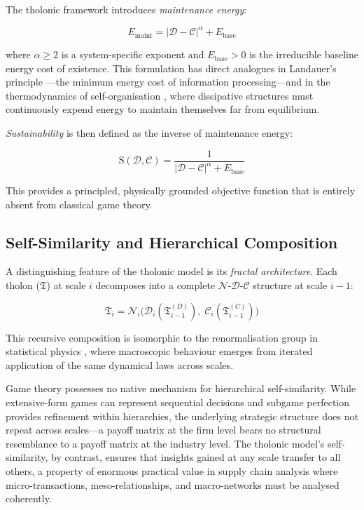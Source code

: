 \documentclass[12pt,a4paper,twocolumn]{article}
\newcommand{\N}{\mathcal{N}}
\newcommand{\D}{\mathcal{D}}
\newcommand{\CC}{\mathcal{C}}
\newcommand{\Sust}{\mathrm{S}}
\newcommand{\Ebase}{E_{\mathrm{base}}}
\newcommand{\tholon}{\mathfrak{T}}
\begin{document}
The tholonic framework introduces \emph{maintenance energy}:

\begin{equation}
\label{eq:maintenance}
E_{\mathrm{maint}} = |\D - \CC|^\alpha + \Ebase
\end{equation}

where $\alpha \geq 2$ is a system-specific exponent and $\Ebase > 0$ is the irreducible baseline energy cost of existence.
This formulation has direct analogues in Landauer's principle \citep{Landauer1961}---the minimum energy cost of information processing---and in the thermodynamics of self-organisation \citep{England2013}, where dissipative structures must continuously expend energy to maintain themselves far from equilibrium.

\emph{Sustainability} is then defined as the inverse of maintenance energy:

\begin{equation}
\label{eq:sustainability}
\Sust(\D, \CC) = \frac{1}{|\D - \CC|^\alpha + \Ebase}
\end{equation}

This provides a principled, physically grounded objective function that is entirely absent from classical game theory.

\subsection{Self-Similarity and Hierarchical Composition}

A distinguishing feature of the tholonic model is its \emph{fractal architecture}.
Each tholon ($\tholon$) at scale $i$ decomposes into a complete $\N$-$\D$-$\CC$ structure at scale $i-1$:

\begin{equation}
\label{eq:recursion}
\tholon_i = \N_i\bigl(\D_i(\tholon_{i-1}^{(D)}),\; \CC_i(\tholon_{i-1}^{(C)})\bigr)
\end{equation}

This recursive composition is isomorphic to the renormalisation group in statistical physics \citep{Wilson1971}, where macroscopic behaviour emerges from iterated application of the same dynamical laws across scales.

Game theory possesses no native mechanism for hierarchical self-similarity.
While extensive-form games can represent sequential decisions and subgame perfection \citep{Selten1965} provides refinement within hierarchies, the underlying strategic structure does not repeat across scales---a payoff matrix at the firm level bears no structural resemblance to a payoff matrix at the industry level.
The tholonic model's self-similarity, by contrast, ensures that insights gained at any scale transfer to all others, a property of enormous practical value in supply chain analysis where micro-transactions, meso-relationships, and macro-networks must be analysed coherently.
\end{document}
